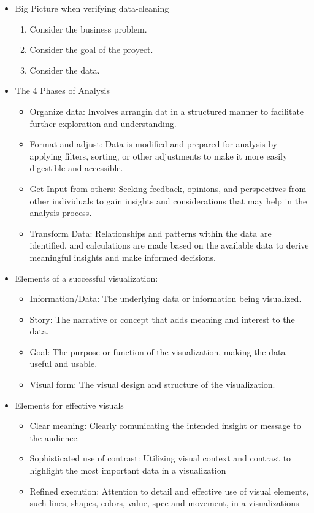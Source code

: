 \documentclass[a4paper]{article}
\begin{document}
\begin{itemize}
        \item Big Picture when verifying data-cleaning 
            \begin{enumerate}
                \item Consider the business problem.
                \item Consider the goal of the proyect.
                \item Consider the data.
            \end{enumerate}

        \item The 4 Phases of Analysis
            \begin{itemize}
                \item Organize data: Involves arrangin dat in a structured manner to facilitate further exploration and understanding.
                \item Format and adjust: Data is modified and prepared for analysis by applying filters, sorting, or other adjustments to make it more easily digestible and accessible. 
                \item Get Input from others: Seeking feedback, opinions, and perspectives from other individuals to gain insights and considerations that may help in the analysis process.
                \item Transform Data: Relationships and patterns within the data are identified, and calculations are made based on the available data to derive meaningful insights and make informed decisions. 
            \end{itemize}
            
        \item Elements of a successful visualization:
            \begin{itemize}
                \item Information/Data: The underlying data or information being visualized.
                \item Story: The narrative or concept that adds meaning and interest to the data.
                \item Goal: The purpose or function of the visualization, making the data useful and usable.
                \item Visual form: The visual design and structure of the visualization.
            \end{itemize}
        
        \item Elements for effective visuals 
            \begin{itemize}
                \item Clear meaning: Clearly comunicating the intended insight or message to the audience.
                \item Sophisticated use of contrast: Utilizing visual context and contrast to highlight the most important data in a visualization
                \item Refined execution: Attention to detail and effective use of visual elements, such lines, shapes, colors, value, spce and movement, in a visualizations
            \end{itemize}




\end{itemize}
\end{document}
